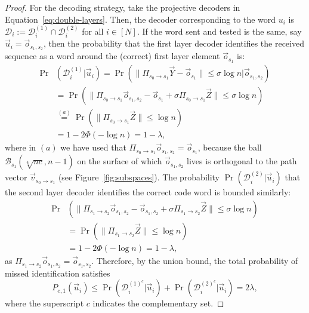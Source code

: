 \documentclass[10pt,conference]{IEEEtran}
\newcommand{\1}{\mathds{1}}
\newcommand{\cB}{\mathcal{B}}
\newcommand{\cD}{\mathcal{D}}
\begin{document}
\begin{proof}
For the decoding strategy, take the projective decoders in Equation~\eqref{eq:double-layers}. Then, the decoder corresponding to the word $u_i$ is $\cD_i:=\cD_i^{(1)}\cap\cD_i^{(2)}$ for all $i\in[N]$. If the word sent and tested is the same, say $\vec u_i=\vec o_{s_1,s_2}$, then the probability that the first layer decoder identifies the received sequence as a word around the (correct) first layer element $\vec o_{s_1}$ is:
\begin{align}\label{eq:double-layers_error1_1}
\Pr&(\cD_{i}^{(1)}|\vec u_i)=\Pr\left(\|\Pi_{s_{0}\to s_{1}}\vec{Y}-\vec o_{s_1}\|\!\leq\!\sigma\log n|\vec o_{s_1,s_2}\right)\nonumber\\
&\!\!=\Pr\left(\|\Pi_{s_{0}\to s_{1}}\vec o_{s_1,s_2}-\vec o_{s_1}+\sigma \Pi_{s_{0}\to s_{1}}\vec{Z}\|\leq \sigma\log n\right)\nonumber\\
&\!\!\stackrel{(a)}{=}\Pr\left(\|\Pi_{s_{0}\to s_{1}}\vec{Z}\|\leq\log n\right)\\
&\!\!=1-2\Phi(-\log n)=1-\lambda\nonumber,
\end{align}
where in $(a)$ we have used that $\Pi_{s_{0}\to s_{1}}\vec o_{s_1,s_2}=\vec o_{s_1}$, because the ball $\cB_{s_1}(\sqrt[4]{nc},n-1)$ on the surface of which $\vec o_{s_1,s_2}$ lives is orthogonal to the path vector $\vec v_{s_0\to s_1}$ (see Figure~\ref{fig:subspaces}). The probability $\Pr(\cD_{i}^{(2)}|\vec u_i)$ that the second layer decoder identifies the correct code word is bounded similarly:
\begin{align}\label{eq:double-layers_error1_2}
\Pr&\left(\|\Pi_{s_{1}\to s_{2}}\vec o_{s_1,s_2}-\vec o_{s_1,s_2}+\sigma \Pi_{s_{1}\to s_{2}}\vec{Z}\|\leq \sigma\log n\right)\nonumber\\
&=\Pr\left(\|\Pi_{s_{1}\to s_{2}}\vec{Z}\|\leq\log n\right)\\
&=1-2\Phi(-\log n)=1-\lambda\nonumber,
\end{align}
as $\Pi_{s_{1}\to s_{2}}\vec o_{s_1,s_2}=\vec o_{s_1,s_2}$.
Therefore, by the union bound, the total probability of missed identification satisfies
\begin{equation}
P_{e,1}(\vec u_i)\leq \Pr(\cD_{i}^{(1)^c}|\vec u_i)+\Pr(\cD_{i}^{(2)^c}|\vec u_i)=2\lambda,
\end{equation}
where the superscript $c$ indicates the complementary set.


\end{proof}
\end{document}
